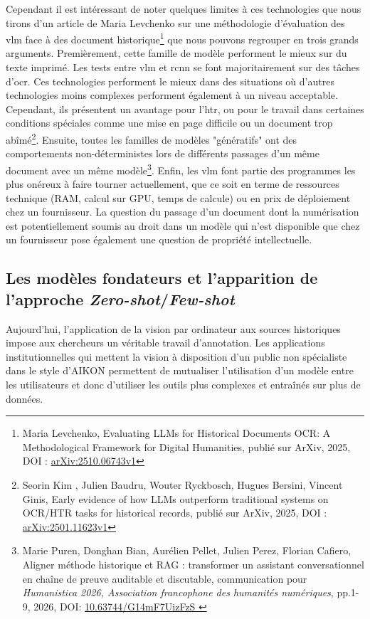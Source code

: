 Cependant il est intéressant de noter quelques limites à ces technologies que nous tirons d'un article de Maria Levchenko sur une méthodologie d'évaluation des \gls{vlm} face à des document historique\footnote{Maria Levchenko, \og Evaluating LLMs for Historical Documents OCR: A Methodological Framework for Digital Humanities\fg, publié sur ArXiv, 2025, DOI : \href{arXiv:2510.06743v1}{arXiv:2510.06743v1}} que nous pouvons regrouper en trois grands arguments. Premièrement, cette famille de modèle performent le mieux sur du texte imprimé. Les tests entre \gls{vlm} et \gls{rcnn} se font majoritairement sur des tâches d'\gls{ocr}. Ces technologies performent le mieux dans des situations où d'autres technologies moins complexes performent également à un niveau acceptable. Cependant, ils présentent un avantage pour l'\gls{htr}, ou pour le travail dans certaines conditions spéciales comme une mise en page difficile ou un document trop abîmé\footnote{Seorin Kim , Julien Baudru, Wouter Ryckbosch, Hugues Bersini, Vincent Ginis, \og Early evidence of how LLMs outperform traditional systems on OCR/HTR tasks for historical records\fg, publié sur ArXiv, 2025, DOI : \href{arXiv:2501.11623v1}{arXiv:2501.11623v1}}. Ensuite, toutes les familles de modèles "génératifs" ont des comportements non-déterministes lors de différents passages d'un même document avec un même modèle\footnote{Marie Puren, Donghan Bian, Aurélien Pellet, Julien Perez, Florian Cafiero, \og  Aligner méthode historique et RAG : transformer un
assistant conversationnel en chaîne de preuve auditable et
discutable\fg, communication pour \textit{Humanistica 2026, Association francophone des humanités numériques}, pp.1-9, 2026, DOI: \href{10.63744/G14mF7UizFzS }{10.63744/G14mF7UizFzS }}. Enfin, les \gls{vlm} font partie des programmes les plus onéreux à faire tourner actuellement, que ce soit en terme de ressources technique (RAM, calcul sur GPU, temps de calcule) ou en prix de déploiement chez un fournisseur. La question du passage d'un document dont la numérisation est potentiellement soumis au droit dans un modèle qui n'est disponible que chez un fournisseur pose également une question de propriété intellectuelle.


\subsection{Les modèles fondateurs et l'apparition de l'approche \textit{Zero-shot}/\textit{Few-shot}}

Aujourd'hui, l'application de la vision par ordinateur aux sources historiques impose aux chercheurs un véritable travail d'annotation. Les applications institutionnelles qui mettent la vision à disposition d'un public non spécialiste dans le style d'AIKON permettent de mutualiser l'utilisation d'un modèle entre les utilisateurs et donc d'utiliser les outils plus complexes et entraînés sur plus de données. 

